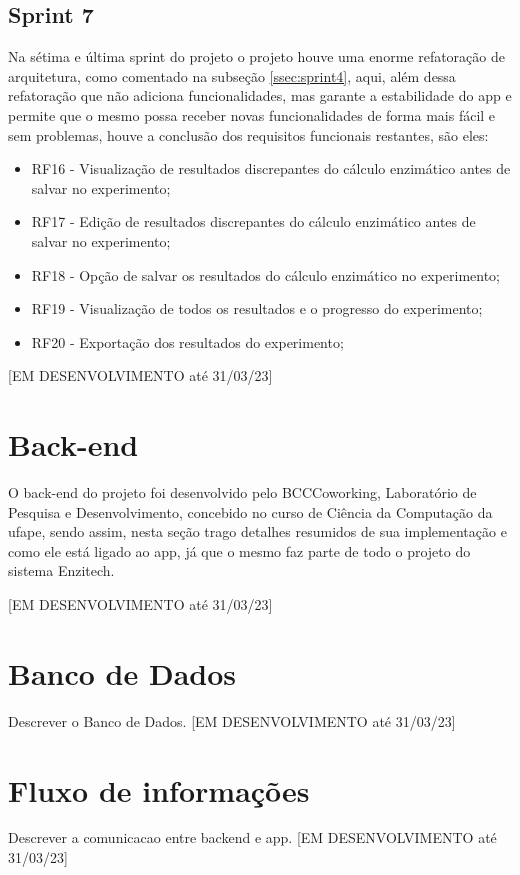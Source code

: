 \subsection{Sprint 7}\label{ssec:sprint7}
Na sétima e última sprint do projeto o projeto houve uma enorme refatoração de arquitetura, como comentado na subseção \ref{ssec:sprint4}, aqui, além dessa refatoração que não adiciona funcionalidades, mas garante a estabilidade do \ac{app} e permite que o mesmo possa receber novas funcionalidades de forma mais fácil e sem problemas, houve a conclusão dos requisitos funcionais restantes, são eles:
\begin{itemize}
   \item RF16 - Visualização de resultados discrepantes do cálculo enzimático antes de salvar no experimento;
   \item RF17 - Edição de resultados discrepantes do cálculo enzimático antes de salvar no experimento;
   \item RF18 - Opção de salvar os resultados do cálculo enzimático no experimento;
   \item RF19 - Visualização de todos os resultados e o progresso do experimento;
   \item RF20 - Exportação dos resultados do experimento;
 \end{itemize}

[EM DESENVOLVIMENTO até 31/03/23]

\section{Back-end}
O back-end do projeto foi desenvolvido pelo BCCCoworking, Laboratório de Pesquisa e Desenvolvimento, concebido no curso de Ciência da Computação da \ac{ufape}, sendo assim, nesta seção trago detalhes resumidos de sua implementação e como ele está ligado ao \ac{app}, já que o mesmo faz parte de todo o projeto do sistema Enzitech.

[EM DESENVOLVIMENTO até 31/03/23]

\section{Banco de Dados}
Descrever o Banco de Dados.
[EM DESENVOLVIMENTO até 31/03/23]

\section{Fluxo de informações}
Descrever a comunicacao entre backend e app.
[EM DESENVOLVIMENTO até 31/03/23]

